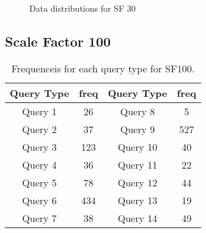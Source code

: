 \begin{figure}[H]
\begin{center}
  \caption{Data distributions for SF 30}
  \label{fig:datadistSF30}
\end{center}
\end{figure}

\subsection{Scale Factor 100}

\begin{table}[H]
\centering
    \begin{tabular}{|c|c|c|c|}
    \hline
    Query Type & freq & Query Type & freq \\ 
    \hline
    \hline
    Query 1 & 26 & Query 8 & 5 \\ 
    \hline       
    Query 2 & 37 & Query 9 & 527 \\  
    \hline        
    Query 3 & 123 & Query 10 & 40 \\ 
    \hline       
    Query 4 & 36 & Query 11 & 22  \\ 
    \hline        
    Query 5 & 78 & Query 12 & 44  \\ 
    \hline        
    Query 6 & 434 & Query 13 & 19  \\  
    \hline        
    Query 7 & 38 & Query 14 & 49  \\ 
    \hline
    \end{tabular}
    \caption{Frequenceis for each query type for SF100.}
    \label{table:freqs_sf100}
\end{table}


